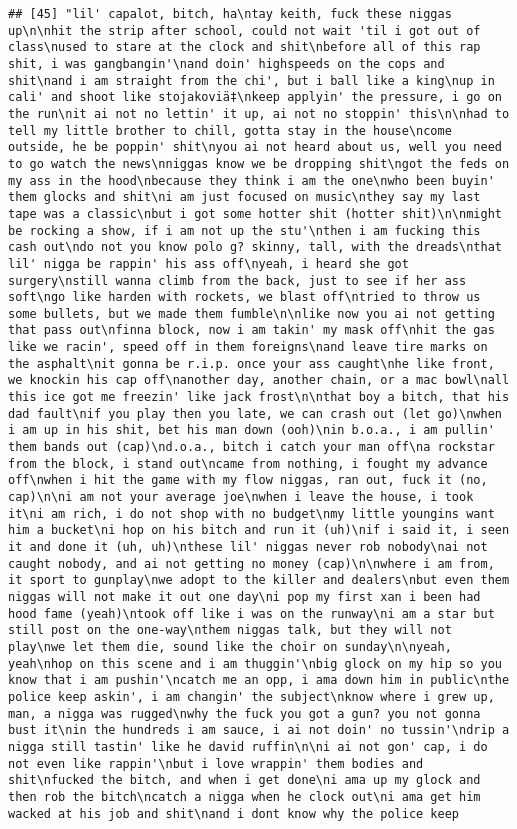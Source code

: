 \documentclass[]{article}
\begin{document}
\begin{verbatim}
## [45] "lil' capalot, bitch, ha\ntay keith, fuck these niggas up\n\nhit the strip after school, could not wait 'til i got out of class\nused to stare at the clock and shit\nbefore all of this rap shit, i was gangbangin'\nand doin' highspeeds on the cops and shit\nand i am straight from the chi', but i ball like a king\nup in cali' and shoot like stojakoviä‡\nkeep applyin' the pressure, i go on the run\nit ai not no lettin' it up, ai not no stoppin' this\n\nhad to tell my little brother to chill, gotta stay in the house\ncome outside, he be poppin' shit\nyou ai not heard about us, well you need to go watch the news\nniggas know we be dropping shit\ngot the feds on my ass in the hood\nbecause they think i am the one\nwho been buyin' them glocks and shit\ni am just focused on music\nthey say my last tape was a classic\nbut i got some hotter shit (hotter shit)\n\nmight be rocking a show, if i am not up the stu'\nthen i am fucking this cash out\ndo not you know polo g? skinny, tall, with the dreads\nthat lil' nigga be rappin' his ass off\nyeah, i heard she got surgery\nstill wanna climb from the back, just to see if her ass soft\ngo like harden with rockets, we blast off\ntried to throw us some bullets, but we made them fumble\n\nlike now you ai not getting that pass out\nfinna block, now i am takin' my mask off\nhit the gas like we racin', speed off in them foreigns\nand leave tire marks on the asphalt\nit gonna be r.i.p. once your ass caught\nhe like front, we knockin his cap off\nanother day, another chain, or a mac bowl\nall this ice got me freezin' like jack frost\n\nthat boy a bitch, that his dad fault\nif you play then you late, we can crash out (let go)\nwhen i am up in his shit, bet his man down (ooh)\nin b.o.a., i am pullin' them bands out (cap)\nd.o.a., bitch i catch your man off\na rockstar from the block, i stand out\ncame from nothing, i fought my advance off\nwhen i hit the game with my flow niggas, ran out, fuck it (no, cap)\n\ni am not your average joe\nwhen i leave the house, i took it\ni am rich, i do not shop with no budget\nmy little youngins want him a bucket\ni hop on his bitch and run it (uh)\nif i said it, i seen it and done it (uh, uh)\nthese lil' niggas never rob nobody\nai not caught nobody, and ai not getting no money (cap)\n\nwhere i am from, it sport to gunplay\nwe adopt to the killer and dealers\nbut even them niggas will not make it out one day\ni pop my first xan i been had hood fame (yeah)\ntook off like i was on the runway\ni am a star but still post on the one-way\nthem niggas talk, but they will not play\nwe let them die, sound like the choir on sunday\n\nyeah, yeah\nhop on this scene and i am thuggin'\nbig glock on my hip so you know that i am pushin'\ncatch me an opp, i ama down him in public\nthe police keep askin', i am changin' the subject\nknow where i grew up, man, a nigga was rugged\nwhy the fuck you got a gun? you not gonna bust it\nin the hundreds i am sauce, i ai not doin' no tussin'\ndrip a nigga still tastin' like he david ruffin\n\ni ai not gon' cap, i do not even like rappin'\nbut i love wrappin' them bodies and shit\nfucked the bitch, and when i get done\ni ama up my glock and then rob the bitch\ncatch a nigga when he clock out\ni ama get him wacked at his job and shit\nand i dont know why the police keep 
\end{verbatim}
\end{document}
